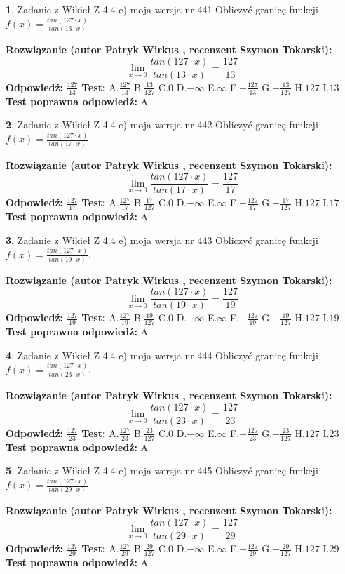 \documentclass[12pt, a4paper]{article}
\theoremstyle{definition} %
\newtheorem{zad}{}
\newcommand{\zadStart}[1]{\begin{zad}#1\newline}
\newcommand{\zadStop}{\end{zad}}
\newcommand{\rozwStart}[2]{\noindent \textbf{Rozwiązanie (autor #1 , recenzent #2): }\newline}
\newcommand{\rozwStop}{\newline}
\newcommand{\odpStart}{\noindent \textbf{Odpowiedź:}\newline}
\newcommand{\odpStop}{\newline}
\newcommand{\testStart}{\noindent \textbf{Test:}\newline}
\newcommand{\testStop}{\newline}
\newcommand{\kluczStart}{\noindent \textbf{Test poprawna odpowiedź:}\newline}
\newcommand{\kluczStop}{\newline}
\begin{document}
\zadStart{Zadanie z Wikieł Z 4.4 e) moja wersja nr 441}
Obliczyć granicę funkcji $f(x)=\frac{tan(127\cdot x)}{tan(13\cdot x)}$.
\zadStop
\rozwStart{Patryk Wirkus}{Szymon Tokarski}
$$\lim\limits_{x\to 0}\frac{tan(127\cdot x)}{tan(13\cdot x)}=
\frac{127}{13}$$
\rozwStop
\odpStart
$\frac{127}{13}$
\odpStop
\testStart
A.$\frac{127}{13}$
B.$\frac{13}{127}$
C.$0$
D.$-\infty$
E.$\infty$
F.$-\frac{127}{13}$
G.$-\frac{13}{127}$
H.$127$
I.$13$
\testStop
\kluczStart
A
\kluczStop



\zadStart{Zadanie z Wikieł Z 4.4 e) moja wersja nr 442}
Obliczyć granicę funkcji $f(x)=\frac{tan(127\cdot x)}{tan(17\cdot x)}$.
\zadStop
\rozwStart{Patryk Wirkus}{Szymon Tokarski}
$$\lim\limits_{x\to 0}\frac{tan(127\cdot x)}{tan(17\cdot x)}=
\frac{127}{17}$$
\rozwStop
\odpStart
$\frac{127}{17}$
\odpStop
\testStart
A.$\frac{127}{17}$
B.$\frac{17}{127}$
C.$0$
D.$-\infty$
E.$\infty$
F.$-\frac{127}{17}$
G.$-\frac{17}{127}$
H.$127$
I.$17$
\testStop
\kluczStart
A
\kluczStop



\zadStart{Zadanie z Wikieł Z 4.4 e) moja wersja nr 443}
Obliczyć granicę funkcji $f(x)=\frac{tan(127\cdot x)}{tan(19\cdot x)}$.
\zadStop
\rozwStart{Patryk Wirkus}{Szymon Tokarski}
$$\lim\limits_{x\to 0}\frac{tan(127\cdot x)}{tan(19\cdot x)}=
\frac{127}{19}$$
\rozwStop
\odpStart
$\frac{127}{19}$
\odpStop
\testStart
A.$\frac{127}{19}$
B.$\frac{19}{127}$
C.$0$
D.$-\infty$
E.$\infty$
F.$-\frac{127}{19}$
G.$-\frac{19}{127}$
H.$127$
I.$19$
\testStop
\kluczStart
A
\kluczStop



\zadStart{Zadanie z Wikieł Z 4.4 e) moja wersja nr 444}
Obliczyć granicę funkcji $f(x)=\frac{tan(127\cdot x)}{tan(23\cdot x)}$.
\zadStop
\rozwStart{Patryk Wirkus}{Szymon Tokarski}
$$\lim\limits_{x\to 0}\frac{tan(127\cdot x)}{tan(23\cdot x)}=
\frac{127}{23}$$
\rozwStop
\odpStart
$\frac{127}{23}$
\odpStop
\testStart
A.$\frac{127}{23}$
B.$\frac{23}{127}$
C.$0$
D.$-\infty$
E.$\infty$
F.$-\frac{127}{23}$
G.$-\frac{23}{127}$
H.$127$
I.$23$
\testStop
\kluczStart
A
\kluczStop



\zadStart{Zadanie z Wikieł Z 4.4 e) moja wersja nr 445}
Obliczyć granicę funkcji $f(x)=\frac{tan(127\cdot x)}{tan(29\cdot x)}$.
\zadStop
\rozwStart{Patryk Wirkus}{Szymon Tokarski}
$$\lim\limits_{x\to 0}\frac{tan(127\cdot x)}{tan(29\cdot x)}=
\frac{127}{29}$$
\rozwStop
\odpStart
$\frac{127}{29}$
\odpStop
\testStart
A.$\frac{127}{29}$
B.$\frac{29}{127}$
C.$0$
D.$-\infty$
E.$\infty$
F.$-\frac{127}{29}$
G.$-\frac{29}{127}$
H.$127$
I.$29$
\testStop
\kluczStart
A
\kluczStop
\end{document}
